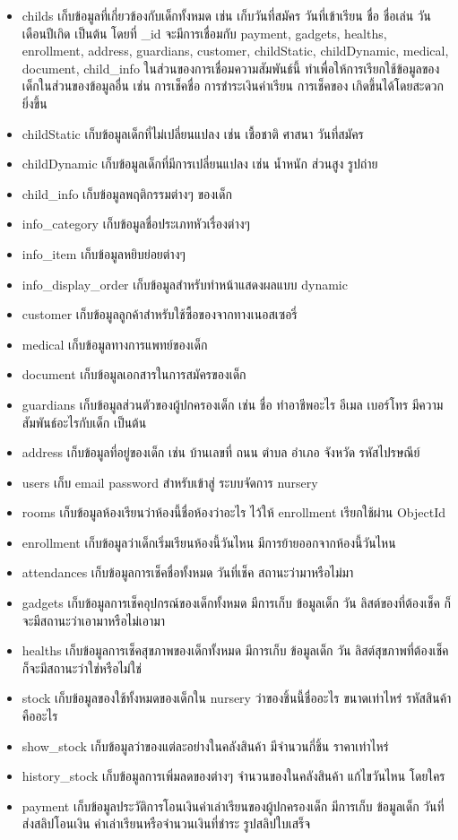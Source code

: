   \begin{itemize}
    \item childs เก็บข้อมูลที่เกี่ยวข้องกับเด็กทั้งหมด เช่น เก็บวันที่สมัคร วันที่เข้าเรียน ชื่อ ชื่อเล่น วันเดือนปีเกิด เป็นต้น  
    โดยที่ \_id จะมีการเชื่อมกับ payment, gadgets, healths, enrollment, address, guardians, customer, childStatic, childDynamic, medical, document, child\_info 
    ในส่วนของการเชื่อมความสัมพันธ์นี้ ทำเพื่อให้การเรียกใช้ข้อมูลของเด็กในส่วนของข้อมูลอื่น เช่น การเช็คชื่อ การชำระเงินค่าเรียน การเช็คของ เกิดขึ้นได้โดยสะดวกยิ่งขึ้น
    \item childStatic เก็บข้อมูลเด็กที่ไม่เปลี่ยนแปลง เช่น เชื้อชาติ ศาสนา วันที่สมัคร
    \item childDynamic เก็บข้อมูลเด็กที่มีการเปลี่ยนแปลง เช่น น้ำหนัก ส่วนสูง รูปถ่าย
    \item child\_info เก็บข้อมูลพฤติกรรมต่างๆ ของเด็ก
    \item info\_category เก็บข้อมูลชื่อประเภทหัวเรื่องต่างๆ
    \item info\_item เก็บข้อมูลหยิบย่อยต่างๆ
    \item info\_display\_order เก็บข้อมูลสำหรับทำหน้าแสดงผลแบบ dynamic
    \item customer เก็บข้อมูลลูกค้าสำหรับใช้ซื้อของจากทางเนอสเซอรี่
    \item medical เก็บข้อมูลทางการแพทย์ของเด็ก
    \item document เก็บข้อมูลเอกสารในการสมัครของเด็ก
    \item guardians เก็บข้อมูลส่วนตัวของผู้ปกครองเด็ก เช่น ชื่อ ทำอาชีพอะไร อีเมล เบอร์โทร มีความสัมพันธ์อะไรกับเด็ก เป็นต้น
    \item address เก็บข้อมูลที่อยู่ของเด็ก เช่น บ้านเลขที่ ถนน ตำบล อำเภอ จังหวัด รหัสไปรษณีย์ 
    \item users เก็บ email password สำหรับเข้าสู่ ระบบจัดการ nursery 
    \item rooms เก็บข้อมูลห้องเรียนว่าห้องนี้ชื่อห้องว่าอะไร ไว้ให้ enrollment เรียกใช้ผ่าน ObjectId
    \item enrollment เก็บข้อมูลว่าเด็กเริ่มเรียนห้องนี้วันไหน มีการย้ายออกจากห้องนี้วันไหน
    \item attendances เก็บข้อมูลการเช็คชื่อทั้งหมด วันที่เช็ค สถานะว่ามาหรือไม่มา
    \item gadgets เก็บข้อมูลการเช็คอุปกรณ์ของเด็กทั้งหมด มีการเก็บ ข้อมูลเด็ก วัน ลิสต์ของที่ต้องเช็ค ก็จะมีสถานะว่าเอามาหรือไม่เอามา
    \item healths เก็บข้อมูลการเช็คสุขภาพของเด็กทั้งหมด มีการเก็บ ข้อมูลเด็ก วัน ลิสต์สุขภาพที่ต้องเช็ค ก็จะมีสถานะว่าใช่หรือไม่ใช่
    \item stock เก็บข้อมูลของใช้ทั้งหมดของเด็กใน nursery ว่าของชิ้นนี้ชื่ออะไร ขนาดเท่าไหร่ รหัสสินค้าคืออะไร
    \item show\_stock เก็บข้อมูลว่าของแต่ละอย่างในคลังสินค้า มีจำนวนกี่ชิ้น ราคาเท่าไหร่
    \item history\_stock เก็บข้อมูลการเพิ่มลดของต่างๆ จำนวนของในคลังสินค้า แก้ไขวันไหน โดยใคร
    \item payment เก็บข้อมูลประวัติการโอนเงินค่าเล่าเรียนของผู้ปกครองเด็ก มีการเก็บ ข้อมูลเด็ก วันที่ส่งสลิปโอนเงิน ค่าเล่าเรียนหรือจำนวนเงินที่ชำระ รูปสลิปใบเสร็จ 
  \end{itemize}


